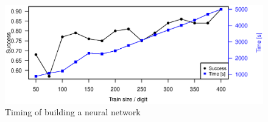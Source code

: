 \begin{figure}[h]
    \centering
    \includegraphics[width=\textwidth]{graphics/nn_timing_trainsize_200}
    \caption{Timing of building a neural network}
    \label{fig:nn_timing_trainsize}
\end{figure}
